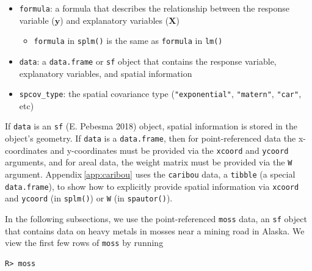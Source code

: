 \documentclass{article}
\providecommand{\tightlist}{%
  \setlength{\itemsep}{0pt}\setlength{\parskip}{0pt}}
\begin{document}
\begin{itemize}
\tightlist
\item
  \texttt{formula}: a formula that describes the relationship between
  the response variable (\(\mathbf{y}\)) and explanatory variables
  (\(\mathbf{X}\))

  \begin{itemize}
  \tightlist
  \item
    \texttt{formula} in \texttt{splm()} is the same as \texttt{formula}
    in \texttt{lm()}
  \end{itemize}
\item
  \texttt{data}: a \texttt{data.frame} or \texttt{sf} object that
  contains the response variable, explanatory variables, and spatial
  information
\item
  \texttt{spcov\_type}: the spatial covariance type
  (\texttt{"exponential"}, \texttt{"matern"}, \texttt{"car"}, etc)
\end{itemize}

If \texttt{data} is an \texttt{sf} (E. Pebesma 2018) object, spatial
information is stored in the object's geometry. If \texttt{data} is a
\texttt{data.frame}, then for point-referenced data the x-coordinates
and y-coordinates must be provided via the \texttt{xcoord} and
\texttt{ycoord} arguments, and for areal data, the weight matrix must be
provided via the \texttt{W} argument. Appendix\(~\)\ref{app:caribou}
uses the \texttt{caribou} data, a \texttt{tibble} (a special
\texttt{data.frame}), to show how to explicitly provide spatial
information via \texttt{xcoord} and \texttt{ycoord} (in \texttt{splm()})
or \texttt{W} (in \texttt{spautor()}).

In the following subsections, we use the point-referenced \texttt{moss}
data, an \texttt{sf} object that contains data on heavy metals in mosses
near a mining road in Alaska. We view the first few rows of
\texttt{moss} by running

\begin{verbatim}
R> moss
\end{verbatim}
\end{document}
